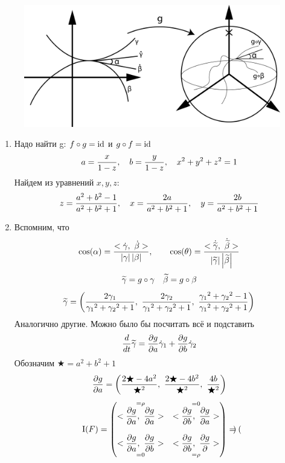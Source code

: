 \documentclass[12pt, fleqn]{article}
\begin{document}
\begin{sol} \
  \begin{figure}[H]
      \includegraphics[scale=0.18]{pics/7_1}
      \centering
  \end{figure}
  \begin{enumerate}
    \item Надо найти g: $f \circ g = \mathop{\rm id}\nolimits$ и $g \circ f = \mathop{\rm id}\nolimits$
    \[a = \dfrac{x}{1-z},\quad b = \dfrac{y}{1-z},\quad x^2 + y^2 + z^2 = 1\]
    Найдем из уравнений $x,y,z$:
    \[z = \dfrac{a^2 + b^2 - 1}{a^2 + b^2 + 1},\quad
    x = \dfrac{2a}{a^2 + b^2 + 1},\quad
    y=\dfrac{2b}{a^2 + b^2 + 1}\]
    \item Вспомним, что
    \[\cos (\alpha) = \dfrac{<\dot{\gamma},\ \dot{\beta}>}{\abs{\gamma} \abs{\beta}},\qq
    \cos (\theta) = \dfrac{<\dot{\w{\gamma}},\ \dot{\w{\beta}}>}{\abs{\w{\gamma}} \abs{\w{\beta}}}\]
    \[\widetilde{\gamma} = g \circ \gamma\quad \widetilde{\beta} = g \circ \beta\]
    \[\widetilde{\gamma} = \left(
      \dfrac{2 \gamma_1}{{\gamma_1}^2 + {\gamma_2}^2 + 1},\
      \dfrac{2 \gamma_2}{{\gamma_1}^2 + {\gamma_2}^2 + 1},\
      \dfrac{{\gamma_1}^2 + {\gamma_2}^2 - 1}{{\gamma_1}^2 + {\gamma_2}^2 + 1}
    \right)\]
    Аналогично другие. Можно было бы посчитать всё и подставить
    \[\dfrac{d}{dt} \widetilde{\gamma} = \dfrac{\partial g}{\partial a} \dot{\gamma}_1 + \dfrac{\partial g}{\partial b} \dot{\gamma}_2\]
    Обозначим $\bigstar = a^2 + b^2 + 1$
    \[\dfrac{\partial g}{\partial a} = \left(
      \dfrac{2\bigstar-4a^2}{\bigstar^2},\
      \dfrac{2\bigstar-4b^2}{\bigstar^2},\
      \dfrac{4b}{\bigstar^2}
    \right)\]
    \[\RNumb{1}(F) = \begin{pmatrix}
      \os{=\rho}{<\dfrac{\d g}{\d a},\ \dfrac{\d g}{\d a}>} & \os{=0}{<\dfrac{\d g}{\d b},\ \dfrac{\d g}{\d a}>}\\ \\
      \us{=0}{<\dfrac{\d g}{\d a},\ \dfrac{\d g}{\d b}>} & \us{=\rho}{<\dfrac{\d g}{\d b},\ \dfrac{\d g}{\d \mathbf{}}>}
    \end{pmatrix} = \begin{pmatrix}

\end{pmatrix}\]
\end{enumerate}
\end{sol}
\end{document}
